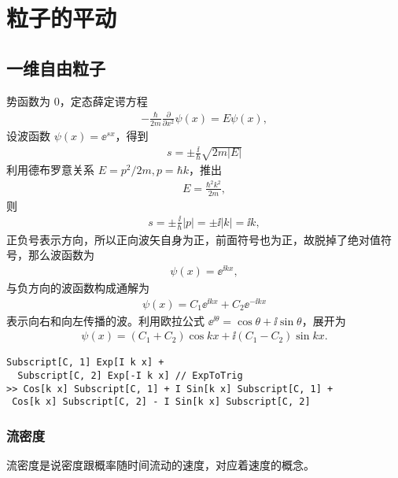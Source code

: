 \chapter{粒子的平动}

\section{一维自由粒子}

势函数为 0，定态薛定谔方程
\begin{eqnarray}
    -\frac{\hbar}{2m} \frac{\partial}{\partial x^2}\psi(x) = E \psi(x),
\end{eqnarray}
设波函数 $\psi(x) = \ee^{s x}$，得到
\begin{eqnarray}
    s = \pm \frac{\ii}{\hbar} \sqrt{2m |E|}
\end{eqnarray}
利用德布罗意关系 $E = p^2 / 2m, p = \hbar k$，推出
\begin{eqnarray}
    E = \frac{\hbar^2k^2}{2m},
\end{eqnarray}
则
\begin{eqnarray}
    s = \pm \frac{\ii}{\hbar}|p| = \pm \ii |k| = \ii k,
\end{eqnarray}
正负号表示方向，所以正向波矢自身为正，前面符号也为正，故脱掉了绝对值符号，那么波函数为
\begin{eqnarray}
    \psi(x) = \ee^{\ii kx},
\end{eqnarray}
与负方向的波函数构成通解为
\begin{eqnarray}
    \psi(x) = C_1 \ee^{\ii kx} + C_2 \ee^{-\ii kx}
\end{eqnarray}
表示向右和向左传播的波。利用欧拉公式 $\ee^{\ii\theta} = \cos\theta + \ii\sin\theta$，展开为
\begin{eqnarray}
    \psi(x) = (C_1 + C_2) \cos kx + \ii (C_1 - C_2) \sin kx.  
\end{eqnarray}
\begin{lstlisting}
Subscript[C, 1] Exp[I k x] + 
  Subscript[C, 2] Exp[-I k x] // ExpToTrig
>> Cos[k x] Subscript[C, 1] + I Sin[k x] Subscript[C, 1] + 
 Cos[k x] Subscript[C, 2] - I Sin[k x] Subscript[C, 2]
\end{lstlisting}

\subsection{流密度}
流密度是说密度跟概率随时间流动的速度，对应着速度的概念。

